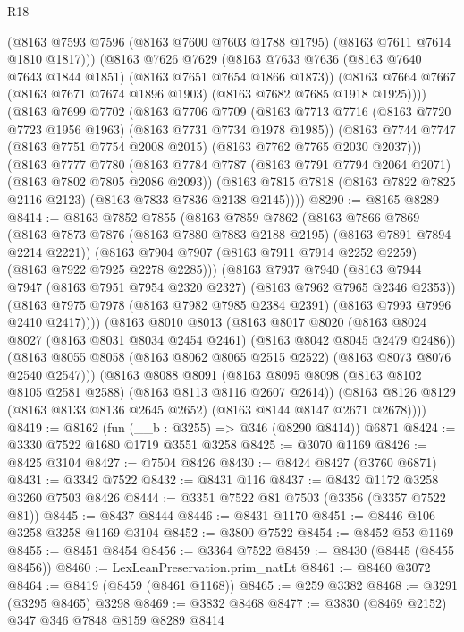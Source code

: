 \begin{lexlean}{R18}
\begin{coremodule}
        (@8163 @7593 @7596 (@8163 @7600 @7603 @1788 @1795) (@8163 @7611 @7614 @1810 @1817)))
      (@8163
        @7626
        @7629
        (@8163 @7633 @7636 (@8163 @7640 @7643 @1844 @1851) (@8163 @7651 @7654 @1866 @1873))
        (@8163 @7664 @7667 (@8163 @7671 @7674 @1896 @1903) (@8163 @7682 @7685 @1918 @1925))))
    (@8163
      @7699
      @7702
      (@8163
        @7706
        @7709
        (@8163 @7713 @7716 (@8163 @7720 @7723 @1956 @1963) (@8163 @7731 @7734 @1978 @1985))
        (@8163 @7744 @7747 (@8163 @7751 @7754 @2008 @2015) (@8163 @7762 @7765 @2030 @2037)))
      (@8163
        @7777
        @7780
        (@8163 @7784 @7787 (@8163 @7791 @7794 @2064 @2071) (@8163 @7802 @7805 @2086 @2093))
        (@8163 @7815 @7818 (@8163 @7822 @7825 @2116 @2123) (@8163 @7833 @7836 @2138 @2145))))
@8290 := @8165 @8289
@8414 := @8163
    @7852
    @7855
    (@8163
      @7859
      @7862
      (@8163
        @7866
        @7869
        (@8163 @7873 @7876 (@8163 @7880 @7883 @2188 @2195) (@8163 @7891 @7894 @2214 @2221))
        (@8163 @7904 @7907 (@8163 @7911 @7914 @2252 @2259) (@8163 @7922 @7925 @2278 @2285)))
      (@8163
        @7937
        @7940
        (@8163 @7944 @7947 (@8163 @7951 @7954 @2320 @2327) (@8163 @7962 @7965 @2346 @2353))
        (@8163 @7975 @7978 (@8163 @7982 @7985 @2384 @2391) (@8163 @7993 @7996 @2410 @2417))))
    (@8163
      @8010
      @8013
      (@8163
        @8017
        @8020
        (@8163 @8024 @8027 (@8163 @8031 @8034 @2454 @2461) (@8163 @8042 @8045 @2479 @2486))
        (@8163 @8055 @8058 (@8163 @8062 @8065 @2515 @2522) (@8163 @8073 @8076 @2540 @2547)))
      (@8163
        @8088
        @8091
        (@8163 @8095 @8098 (@8163 @8102 @8105 @2581 @2588) (@8163 @8113 @8116 @2607 @2614))
        (@8163 @8126 @8129 (@8163 @8133 @8136 @2645 @2652) (@8163 @8144 @8147 @2671 @2678))))
@8419 := @8162 (fun (__b : @3255) => @346 (@8290 @8414)) @6871
@8424 := @3330 @7522 @1680 @1719 @3551 @3258
@8425 := @3070 @1169
@8426 := @8425 @3104
@8427 := @7504 @8426
@8430 := @8424 @8427 (@3760 @6871)
@8431 := @3342 @7522
@8432 := @8431 @116
@8437 := @8432 @1172 @3258 @3260 @7503 @8426
@8444 := @3351 @7522 @81 @7503 (@3356 (@3357 @7522 @81))
@8445 := @8437 @8444
@8446 := @8431 @1170
@8451 := @8446 @106 @3258 @3258 @1169 @3104
@8452 := @3800 @7522
@8454 := @8452 @53 @1169
@8455 := @8451 @8454
@8456 := @3364 @7522
@8459 := @8430 (@8445 (@8455 @8456))
@8460 := LexLeanPreservation.prim_natLt
@8461 := @8460 @3072
@8464 := @8419 (@8459 (@8461 @1168))
@8465 := @259 @3382
@8468 := @3291 (@3295 @8465) @3298
@8469 := @3832 @8468
@8477 := @3830 (@8469 @2152) @347 @346 @7848 @8159 @8289 @8414

\end{coremodule}
\end{lexlean}
